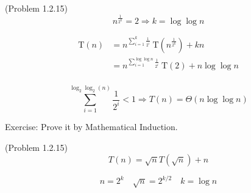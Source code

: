\begin{frame}{(Problem 1.2.15)}
  \[
	n^{\frac{1}{2^k}} = 2 \Rightarrow k = \log\log n
  \]

  \pause

  \begin{align*} 
	\text{T}(n) &= n^{\sum_{i=1}^{k}\frac{1}{2^i}}\ \text{T}\left(n^{\frac{1}{2^k}}\right ) +kn\\ 
		&=n^{\sum_{i=1}^{\log\log n}\frac{1}{2^i}}\ \text{T}(2) + n \log\log n\\ 
  \end{align*}

  \pause
  \[
	\sum_{i=1}^{\log_2\log_2(n)}\frac{1}{2^i} < 1 \Rightarrow T(n) = \Theta(n \log \log n)
  \]

  \pause
  \vspace{0.30cm}
  \centerline{Exercise: Prove it by Mathematical Induction.}
\end{frame}

\begin{frame}{(Problem 1.2.15)}
  \[
	T(n) = \sqrt{n} T(\sqrt{n}) + n
  \]

  \[
	n = 2^k \quad \sqrt{n} = 2^{k/2} \quad k = \log n
  \]
\end{frame}
